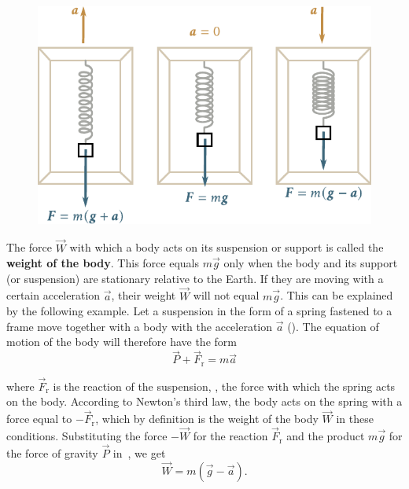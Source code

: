 \begin{figure}[t]
	\begin{center}
		\includegraphics[scale=1]{figures/ch_02/fig_2_11.pdf}
		\caption[]{}
		\label{fig:2_11}
	\end{center}
	\vspace{-0.7cm}
\end{figure}

The force $\vec{W}$ with which a body acts on its suspension or support is called the \textbf{weight of the body}. This force equals $m\vec{g}$ only when the body and its support (or suspension) are stationary relative to the Earth. If they are moving with a certain acceleration $\vec{a}$, their weight $\vec{W}$ will not equal $m\vec{g}$. This can be explained by the following example. Let a suspension in the form of a spring fastened to a frame move together with a body with the acceleration $\vec{a}$ (). The equation of motion of the body will therefore have the form
\begin{equation}\label{eq:2_39}
\vec{P} + \vec{F}_{\text{r}} = m\vec{a}
\end{equation}

\noindent
where $\vec{F}_{\text{r}}$ is the reaction of the suspension, \ie, the force with which the spring acts on the body. According to Newton's third law, the body acts on the spring with a force equal to $-\vec{F}_{\text{r}}$, which by definition is the weight of the body $\vec{W}$ in these conditions. Substituting the force $-\vec{W}$ for the reaction $\vec{F}_{\text{r}}$ and the product $m\vec{g}$ for the force of gravity $\vec{P}$ in~, we get
\begin{equation}\label{eq:2_40}
\vec{W} = m(\vec{g} - \vec{a}).
\end{equation}

